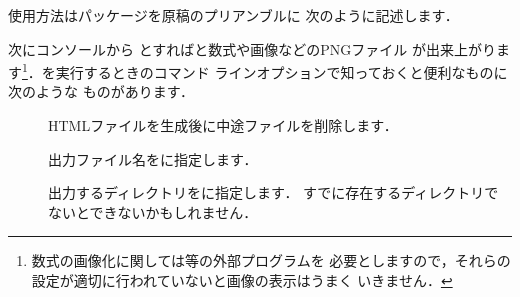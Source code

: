 
使用方法はパッケージを原稿のプリアンブルに
次のように記述します．

\begin{InTeX}
\usepackage[html,charset=Shift_JIS,png]{tex4ht}
\end{InTeX}

次にコンソールから
とすればと数式や画像などのPNGファイル
が出来上がります\footnote{数式の画像化に関しては\IM 等の外部プログラムを
必要としますので，それらの設定が適切に行われていないと画像の表示はうまく
いきません．}．を実行するときのコマンド
ラインオプションで知っておくと便利なものに次のような
ものがあります．
\begin{description}
 \item[] 
   HTMLファイルを生成後に中途ファイルを削除します．
 \item[]
 出力ファイル名をに指定します．
 \item[]
 出力するディレクトリをに指定します．
 すでに存在するディレクトリでないとできないかもしれません．
\end{description}

